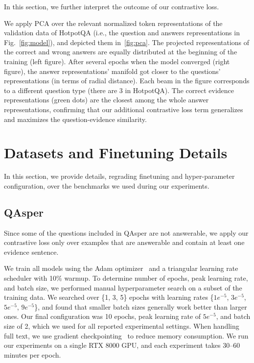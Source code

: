 In this section, we further interpret the outcome of our contrastive loss.

We apply PCA over the relevant normalized token representations of the validation data of HotpotQA (i.e., the question and answers representations in Fig.~\ref{fig:model}), and depicted them in~\ref{fig:pca}. The projected representations of the correct and wrong answers are equally distributed at the beginning of the training (left figure). After several epochs when the model converged (right figure), the answer representations' manifold got closer to the questions' representations (in terms of radial distance). Each beam in the figure corresponds to a different question type (there are 3 in HotpotQA). The correct evidence representations (green dots) are the closest among the whole answer representations, confirming that our additional contrastive loss term generalizes and maximizes the question-evidence similarity. 


\section{Datasets and Finetuning Details}
\label{sec:appndx2}
In this section, we provide details, regrading finetuning and hyper-parameter configuration, over the benchmarks we used during our experiments.

\subsection{QAsper}
\label{subsec:qasper}
Since some of the questions included in QAsper are not answerable, we apply our contrastive loss only over examples that are answerable and contain at least one evidence sentence. 

We train all models using the Adam optimizer~\citep{kingma2014adam} and a triangular learning rate scheduler \cite{howard2018universal} with 10\% warmup. To determine number of epochs, peak learning rate, and batch size, we performed manual hyperparameter search on a subset of the training data. We searched over \{1, 3, 5\} epochs with learning rates \{$1e^{-5}$, $3e^{-5}$, $5e^{-5}$, $9e^{-5}$\}, and found that smaller batch sizes generally work better than larger ones. Our final configuration was 10 epochs, peak learning rate of $5e^{-5}$, and batch size of 2, which we used for all reported experimental settings.  When handling full text, we use gradient checkpointing~\cite{gradckpt} to reduce memory consumption. We run our experiments on a single RTX 8000 GPU, and each experiment takes 30--60 minutes per epoch. 


